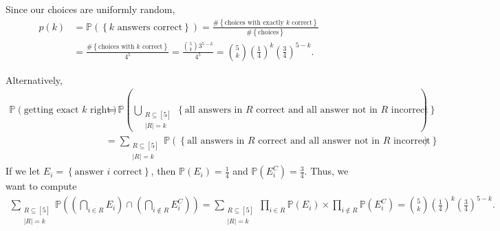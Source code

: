 \begin{explanation}
    Since our choices are uniformly random, 
    \begin{align*}
        p(k) &= \mathbb{P} (\left\{ k \text{ answers correct}  \right\}) = \frac{\# \left\{ \text{choices with exactly } k \text{ correct}   \right\} }{\# \left\{ \text{choices}  \right\} } \\
        &= \frac{\# \left\{ \text{choices with } k \text{ correct}   \right\} }{4^5} = \frac{\binom{5}{k} 3^{5 - k}}{4^5} = \binom{5}{k} \left( \frac{1}{4} \right)^k \left( \frac{3}{4} \right)^{5-k}.  
    \end{align*}

    Alternatively, 
    \begin{align*}
        \mathbb{P} (\text{getting exact } k \text{ right}) &= \mathbb{P} ( \bigcup_{\substack{R \subseteq [5] \\ \vert R \vert = k }} \left\{ \text{all answers in } R \text{ correct and all answer not in } R \text{ incorrect}    \right\}   ) \\
        &= \sum_{\substack{R \subseteq [5] \\ \vert R \vert = k}} \mathbb{P} \left( \left\{ \text{all answers in } R \text{ correct and all answer not in } R \text{ incorrect}    \right\}   \right)   
    \end{align*}
    If we let \(E_i = \left\{ \text{answer } i \text{ correct}   \right\} \), then \(\mathbb{P} (E_i) = \frac{1}{4}\) and \(\mathbb{P} (E_i^C) = \frac{3}{4}\). 
    Thus, we want to compute
    \begin{align*}
        \sum_{\substack{R \subseteq [5] \\ \vert R \vert = k}} \mathbb{P} \left( \left( \bigcap_{i \in R} E_i  \right) \cap \left( \bigcap_{i \notin R} E_i^C  \right)   \right) = \sum_{\substack{R \subseteq [5] \\ \vert R \vert = k }} \prod _{i \in R} \mathbb{P} (E_i) \times \prod _{i \notin R} \mathbb{P} (E_i^C) = \binom{5}{k} \left( \frac{1}{4} \right)^k \left( \frac{3}{4} \right)^{5-k}.     
    \end{align*}   
\end{explanation}